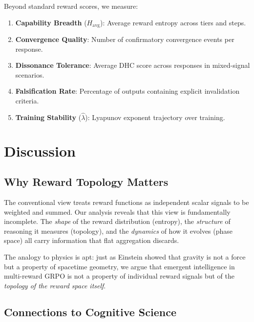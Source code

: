 \documentclass{article}
\begin{document}
Beyond standard reward scores, we measure:

\begin{enumerate}
    \item \textbf{Capability Breadth} ($H_{\text{avg}}$): Average reward entropy across tiers and steps.
    \item \textbf{Convergence Quality}: Number of confirmatory convergence events per response.
    \item \textbf{Dissonance Tolerance}: Average DHC score across responses in mixed-signal scenarios.
    \item \textbf{Falsification Rate}: Percentage of outputs containing explicit invalidation criteria.
    \item \textbf{Training Stability} ($\hat{\lambda}$): Lyapunov exponent trajectory over training.
\end{enumerate}

\section{Discussion}

\subsection{Why Reward Topology Matters}

The conventional view treats reward functions as independent scalar signals to be weighted and summed. Our analysis reveals that this view is fundamentally incomplete. The \emph{shape} of the reward distribution (entropy), the \emph{structure} of reasoning it measures (topology), and the \emph{dynamics} of how it evolves (phase space) all carry information that flat aggregation discards.

The analogy to physics is apt: just as Einstein showed that gravity is not a force but a property of spacetime geometry, we argue that emergent intelligence in multi-reward GRPO is not a property of individual reward signals but of the \emph{topology of the reward space itself}.

\subsection{Connections to Cognitive Science}
\end{document}
